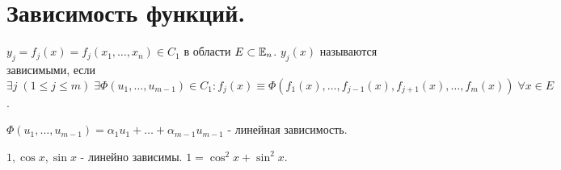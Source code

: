 \documentclass[../main.tex]{subfiles}
\begin{document}
\section{Зависимость функций.}


\begin{definition}
 $y_{j} = f_{j}(x) = f_{j}(x_{1},\dots,x_{n}) \in C_{1} $ в области $E \subset \mathbb{E}_{n}$. $y_{j}(x)$ называются зависимыми, если $\exists j \;(1\leqslant j \leqslant m) \; \exists \varPhi (u_{1},\dots,u_{m-1})\in C_{1} : f_{j}(x) \equiv \varPhi (f_{1}(x),\dots,f_{j-1}(x),f_{j+1}(x),\dots,f_{m}(x)) \; \forall x \in E$.
\end{definition}
$\varPhi( u_{1},\dots,u_{m-1}) = \alpha_{1} u_{1}+ \dots + \alpha_{m-1} u_{m-1}$ - линейная зависимость. 

\noindent $1, \cos{x}, \sin{x}$ - линейно зависимы. \qquad $1=\cos^{2}{x} + \sin^{2}{x}$.
\end{document}

